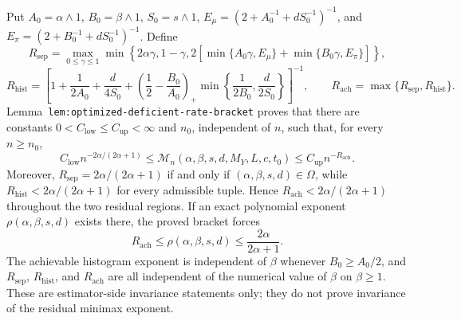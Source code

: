 Put \(A_0=\alpha\wedge1\), \(B_0=\beta\wedge1\), \(S_0=s\wedge1\), \(E_\mu=(2+A_0^{-1}+dS_0^{-1})^{-1}\), and \(E_\pi=(2+B_0^{-1}+dS_0^{-1})^{-1}\). Define
\[
R_{\mathrm{sep}}
=
\max_{0\le\gamma\le1}
\min\left\{
2\alpha\gamma,
1-\gamma,
2\left[\min\{A_0\gamma,E_\mu\}+\min\{B_0\gamma,E_\pi\}\right]
\right\},
\]
\[
R_{\mathrm{hist}}
=
\left[
1+\frac1{2A_0}+\frac d{4S_0}
+\left(\frac12-\frac{B_0}{A_0}\right)_+
\min\left\{\frac1{2B_0},\frac d{2S_0}\right\}
\right]^{-1},
\qquad
R_{\mathrm{ach}}=\max\{R_{\mathrm{sep}},R_{\mathrm{hist}}\}.
\]
Lemma~\texttt{lem:optimized-deficient-rate-bracket} proves that there are constants \(0<C_{\mathrm{low}}\le C_{\mathrm{up}}<\infty\) and \(n_0\), independent of \(n\), such that, for every \(n\ge n_0\),
\[
C_{\mathrm{low}}n^{-2\alpha/(2\alpha+1)}
\le
\mathcal M_n(\alpha,\beta,s,d,M_Y,L,c,t_0)
\le
C_{\mathrm{up}}n^{-R_{\mathrm{ach}}}.
\]
Moreover, \(R_{\mathrm{sep}}=2\alpha/(2\alpha+1)\) if and only if \((\alpha,\beta,s,d)\in\Omega\), while \(R_{\mathrm{hist}}<2\alpha/(2\alpha+1)\) for every admissible tuple. Hence \(R_{\mathrm{ach}}<2\alpha/(2\alpha+1)\) throughout the two residual regions. If an exact polynomial exponent \(\rho(\alpha,\beta,s,d)\) exists there, the proved bracket forces
\[
R_{\mathrm{ach}}
\le
\rho(\alpha,\beta,s,d)
\le
\frac{2\alpha}{2\alpha+1}.
\]
The achievable histogram exponent is independent of \(\beta\) whenever \(B_0\ge A_0/2\), and \(R_{\mathrm{sep}}\), \(R_{\mathrm{hist}}\), and \(R_{\mathrm{ach}}\) are all independent of the numerical value of \(\beta\) on \(\beta\ge1\). These are estimator-side invariance statements only; they do not prove invariance of the residual minimax exponent.